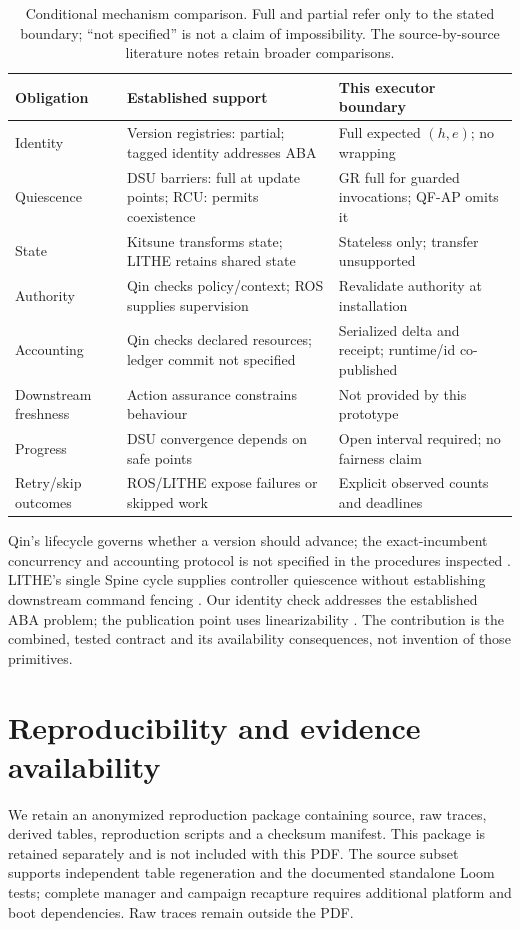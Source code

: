 \begin{table}[!ht]
\caption{Conditional mechanism comparison. Full and partial refer only to the stated boundary; ``not specified'' is not a claim of impossibility. The source-by-source literature notes retain broader comparisons.}
\label{tab:related}
\centering\small
\begin{tabular}{@{}p{.19\linewidth}p{.37\linewidth}p{.36\linewidth}@{}}
\toprule
Obligation & Established support & This executor boundary\\\midrule
Identity & Version registries: partial; tagged identity addresses ABA & Full expected $(h,e)$; no wrapping\\
Quiescence & DSU barriers: full at update points; RCU: permits coexistence & GR full for guarded invocations; QF-AP omits it\\
State & Kitsune transforms state; LITHE retains shared state & Stateless only; transfer unsupported\\
Authority & Qin checks policy/context; ROS supplies supervision & Revalidate authority at installation\\
Accounting & Qin checks declared resources; ledger commit not specified & Serialized delta and receipt; runtime/id co-published\\
Downstream freshness & Action assurance constrains behaviour & Not provided by this prototype\\
Progress & DSU convergence depends on safe points & Open interval required; no fairness claim\\
Retry/skip outcomes & ROS/LITHE expose failures or skipped work & Explicit observed counts and deadlines\\
\bottomrule
\end{tabular}
\end{table}

Qin's lifecycle governs whether a version should advance; the exact-incumbent concurrency and accounting protocol is not specified in the procedures inspected \citep{qin2026governed}. LITHE's single Spine cycle supplies controller quiescence without establishing downstream command fencing \citep{lim2026lithe}. Our identity check addresses the established ABA problem; the publication point uses linearizability \citep{michael2004hazard,herlihy1990linearizability}. The contribution is the combined, tested contract and its availability consequences, not invention of those primitives.

\section{Reproducibility and evidence availability}
\label{app:artifact}
We retain an anonymized reproduction package containing source, raw traces, derived tables, reproduction scripts and a checksum manifest. This package is retained separately and is not included with this PDF. The source subset supports independent table regeneration and the documented standalone Loom tests; complete manager and campaign recapture requires additional platform and boot dependencies. Raw traces remain outside the PDF.
